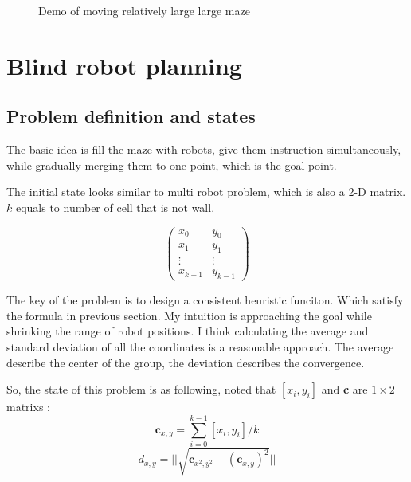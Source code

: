 \documentclass{article}
\begin{document}
\begin{figure*}[!t]
\normalsize
\centering
{}
\caption{Demo of moving relatively large large maze}
\label{m-5} %
\end{figure*}






\clearpage
\section{Blind robot planning}
\subsection{Problem definition and states}

The basic idea is fill the maze with robots, give them instruction simultaneously, while gradually merging them to one point, which is the goal point.

The initial state looks similar to multi robot problem, which is also a 2-D matrix. $k$ equals to number of cell that is not wall.

$$\begin{pmatrix}
x_0 & y_0 \\
x_1 & y_1 \\
\vdots & \vdots \\	
x_{k-1} & y_{k-1}
\end{pmatrix}$$

The key of the problem is to design a consistent heuristic funciton. Which satisfy the formula in previous section. My intuition is approaching the goal while shrinking the range of robot positions. I think calculating the average and standard deviation of all the coordinates is a reasonable approach. The average describe the center of the group, the deviation describes the convergence. 

So, the state of this problem is as following, noted that $[x_i,y_i]$ and \textbf{c} are $1\times 2$ matrixs :
$$\textbf{c}_{x,y} = \sum^{k-1}_{i=0}[x_i,y_i]/k$$
$$d_{x,y} = ||\sqrt{ \textbf{c}_{x^2,y^2} - (\textbf{c}_{x,y})^2}||$$
\end{document}
